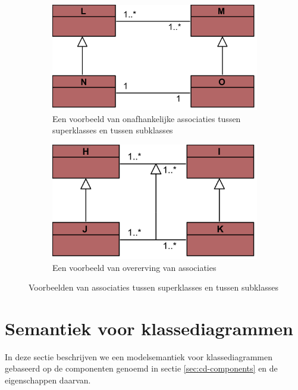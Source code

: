 \begin{figure}
	\centering
	\begin{subfigure}{0.4\textwidth}
		\includegraphics[width=\textwidth]{chap-consistentie/assoc-hier.png}
		\caption{Een voorbeeld van onafhankelijke associaties tussen superklasses en tussen subklasses}
		\label{fig:assoc-hier}
	\end{subfigure}
	\hfill
	\begin{subfigure}{0.4\textwidth}
		\vspace{-0.2cm}
		\includegraphics[width=\textwidth]{chap-consistentie/assoc-gen.png}
		\caption{Een voorbeeld van overerving van associaties}
		\label{fig:assoc-gen}
	\end{subfigure}
	\caption{Voorbeelden van associaties tussen superklasses en tussen subklasses}
	\label{fig:assoc-hier-gen}
\end{figure}

\section{Semantiek voor klassediagrammen}

In deze sectie beschrijven we een modelsemantiek voor klassediagrammen gebaseerd op de componenten genoemd in sectie \ref{sec:cd-components} en de eigenschappen daarvan.


